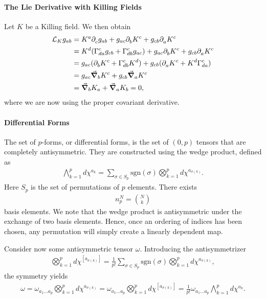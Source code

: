 \paragraph{The Lie Derivative with Killing Fields}
Let $K$ be a Killing field. We then obtain
\begin{align*}
\lied{K}{g_{ab}} &= K^{a}\del{c}{g_{ab}} + g_{ac}\del{b}{K^{c}} + g_{cb}\del{a}{K^{c}} \\
&= K^{d}(\chris{c}{d}{a}g_{cb} + \chris{c}{d}{b}g_{ac}) + g_{ac}\del{b}{K^{c}} + g_{cb}\del{a}{K^{c}} \\
&= g_{ac}(\del{b}{K^{c}} + \chris{c}{d}{b}K^{d}) + g_{cb}(\del{a}{K^{c}} + K^{d}\chris{c}{d}{a}) \\
&= g_{ac}\dcov{b}{K^{c}} + g_{cb}\dcov{a}{K^{c}} \\
&= \dcov{b}{K_{a}} + \dcov{a}{K_{b}} = 0,
\end{align*}
where we are now using the proper covariant derivative.

\paragraph{Differential Forms}
The set of $p$-forms, or differential forms, is the set of $(0, p)$ tensors that are completely antisymmetric. They are constructed using the wedge product, defined as
\begin{align*}
\bigwedge\limits_{k = 1}^{p}d\chi^{a_{k}} = \sum\limits_{\sigma\in S_{p}}\text{sgn}(\sigma)\bigotimes_{k = 1}^{p}d\chi^{a_{\sigma(k)}}.
\end{align*}
Here $S_{p}$ is the set of permutations of $p$ elements. There exists
\begin{align*}
n_{p}^{N} = {N\choose k}
\end{align*}
basis elements. We note that the wedge product is antisymmetric under the exchange of two basis elements. Hence, once an ordering of indices has been chosen, any permutation will simply create a linearly dependent map.

Consider now some antisymmetric tensor $\omega$. Introducing the antisymmetrizer
\begin{align*}
\bigotimes_{k = 1}^{p}d\chi^{[a_{\sigma(k)}]} = \frac{1}{p!}\sum\limits_{\sigma\in S_{p}}\text{sgn}(\sigma)\bigotimes_{k = 1}^{p}d\chi^{a_{\sigma(k)}},
\end{align*}
the symmetry yields
\begin{align*}
\omega = \omega_{a_{1}\dots a_{p}}\bigotimes_{k = 1}^{p}d\chi^{a_{\sigma(k)}} = \omega_{a_{1}\dots a_{p}}\bigotimes_{k = 1}^{p}d\chi^{[a_{\sigma(k)}]} = \frac{1}{p!}\omega_{a_{1}\dots a_{p}}\bigwedge\limits_{k = 1}^{p}d\chi^{a_{k}}.
\end{align*}

